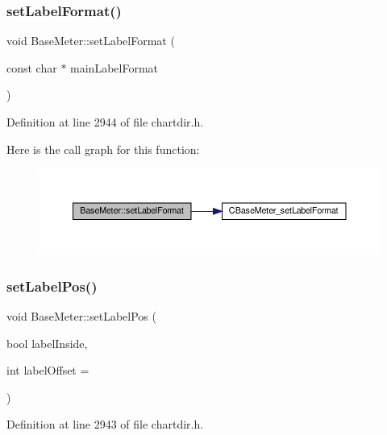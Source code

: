 \subsubsection{\texorpdfstring{set\+Label\+Format()}{setLabelFormat()}}
{\footnotesize\ttfamily void Base\+Meter\+::set\+Label\+Format (\begin{DoxyParamCaption}\item[{const char $\ast$}]{main\+Label\+Format }\end{DoxyParamCaption})\hspace{0.3cm}{\ttfamily [inline]}}



Definition at line 2944 of file chartdir.\+h.

Here is the call graph for this function\+:
\nopagebreak
\begin{figure}[H]
\begin{center}
\leavevmode
\includegraphics[width=350pt]{class_base_meter_a1e93a1c74681f4fd32b93e068913efb7_cgraph}
\end{center}
\end{figure}
\mbox{\label{class_base_meter_ace5fe7e4565e651924666b02ae69da65}} 
\subsubsection{\texorpdfstring{set\+Label\+Pos()}{setLabelPos()}}
{\footnotesize\ttfamily void Base\+Meter\+::set\+Label\+Pos (\begin{DoxyParamCaption}\item[{bool}]{label\+Inside,  }\item[{int}]{label\+Offset = {} }\end{DoxyParamCaption})\hspace{0.3cm}{\ttfamily [inline]}}



Definition at line 2943 of file chartdir.\+h.

